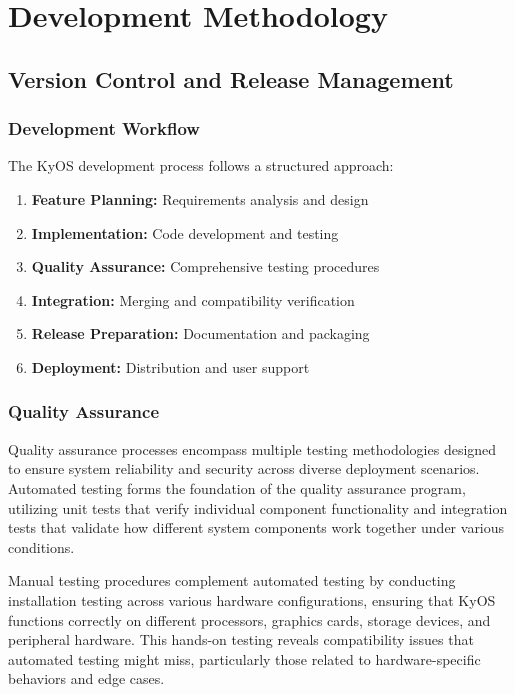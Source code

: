 \documentclass[12pt,a4paper]{article}
\begin{document}
\section{Development Methodology}

\subsection{Version Control and Release Management}

\subsubsection{Development Workflow}
The KyOS development process follows a structured approach:

\begin{enumerate}
    \item \textbf{Feature Planning:} Requirements analysis and design
    \item \textbf{Implementation:} Code development and testing
    \item \textbf{Quality Assurance:} Comprehensive testing procedures
    \item \textbf{Integration:} Merging and compatibility verification
    \item \textbf{Release Preparation:} Documentation and packaging
    \item \textbf{Deployment:} Distribution and user support
\end{enumerate}

\subsubsection{Quality Assurance}
Quality assurance processes encompass multiple testing methodologies designed to ensure system reliability and security across diverse deployment scenarios. Automated testing forms the foundation of the quality assurance program, utilizing unit tests that verify individual component functionality and integration tests that validate how different system components work together under various conditions.

Manual testing procedures complement automated testing by conducting installation testing across various hardware configurations, ensuring that KyOS functions correctly on different processors, graphics cards, storage devices, and peripheral hardware. This hands-on testing reveals compatibility issues that automated testing might miss, particularly those related to hardware-specific behaviors and edge cases.
\end{document}

